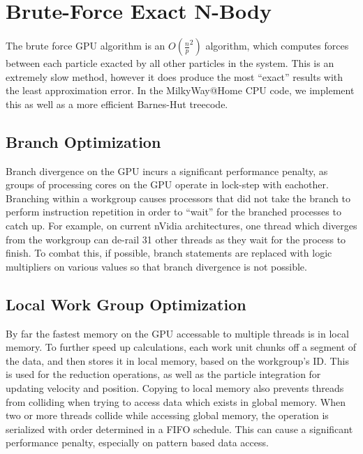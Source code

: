 \documentclass[fleqn,10pt]{SelfArx} %
\begin{document}

\section{Brute-Force Exact N-Body}
The brute force GPU algorithm is an $O(\frac{n}{p}^2)$ algorithm, which computes forces between each particle exacted by all other particles in the system. This is an extremely slow method, however it does produce the most “exact” results with the least approximation error. In the MilkyWay@Home CPU code, we implement this as well as a more efficient Barnes-Hut treecode.

\subsection{Branch Optimization}
Branch divergence on the GPU incurs a significant performance penalty, as groups of processing cores on the GPU operate in lock-step with eachother. Branching within a workgroup causes processors that did not take the branch to perform instruction repetition in order to “wait” for the branched processes to catch up. For example, on current nVidia architectures, one thread which diverges from the workgroup can de-rail 31 other threads as they wait for the process to finish. To combat this, if possible, branch statements are replaced with logic multipliers on various values so that branch divergence is not possible.

\subsection{Local Work Group Optimization}
By far the fastest memory on the GPU accessable to multiple threads is in local memory. To further speed up calculations, each work unit chunks off a segment of the data, and then stores it in local memory, based on the workgroup’s ID. This is used for the reduction operations, as well as the particle integration for updating velocity and position. Copying to local memory also prevents threads from colliding when trying to access data which exists in global memory. When two or more threads collide while accessing global memory, the operation is serialized with order determined in a FIFO schedule. This can cause a significant performance penalty, especially on pattern based data access.



\end{document}
